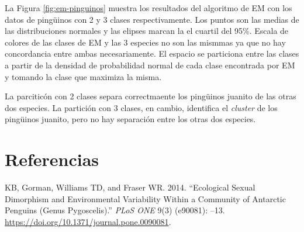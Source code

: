 \documentclass[]{tufte-handout}
\begin{document}
La Figura \ref{fig:em-pinguinos} muestra los resultados del algoritmo de EM con los datos de pingüinos con 2 y 3 clases respectivamente. Los puntos son las medias de las distribuciones normales y las elipses marcan la el cuartil del 95\%. Escala de colores de las clases de EM y las 3 especies no son las mismmas ya que no hay concordancia entre ambas necesariamente. El espacio se particiona entre las clases a partir de la densidad de probabilidad normal de cada clase encontrada por EM y tomando la clase que maximiza la misma.

La parciticón con 2 clases separa correctmaente los pingüinos juanito de las otras dos especies. La partición con 3 clases, en cambio, identifica el \emph{cluster} de los pingüinos juanito, pero no hay separación entre los otras dos especies.

\hypertarget{referencias}{%
\section*{Referencias}\label{referencias}}

\hypertarget{refs}{}
\leavevmode\hypertarget{ref-R-palmerpenguins}{}%
KB, Gorman, Williams TD, and Fraser WR. 2014. ``Ecological Sexual Dimorphism and Environmental Variability Within a Community of Antarctic Penguins (Genus Pygoscelis).'' \emph{PLoS ONE} 9(3) (e90081): --13. \url{https://doi.org/10.1371/journal.pone.0090081}.
\end{document}
